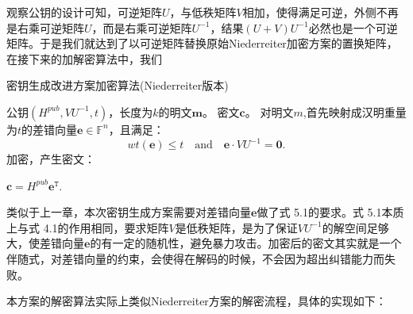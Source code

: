 观察公钥的设计可知，可逆矩阵$U$，与低秩矩阵$V$相加，使得满足可逆，外侧不再是右乘可逆矩阵$U$，而是右乘可逆矩阵$U^{-1}$，结果$(U + V)U^{-1}$必然也是一个可逆矩阵。于是我们就达到了以可逆矩阵替换原始Niederreiter加密方案的置换矩阵，在接下来的加解密算法中，我们

\begin{breakablealgorithm}
	\small
	\renewcommand{\algorithmicrequire}{\textbf{Input:}}
	\renewcommand{\algorithmicensure}{\textbf{Output:}}
	\caption{密钥生成改进方案加密算法(Niederreiter版本)}
	\label{alg:NeweEnN}
	\begin{algorithmic}[1]
		\Require
		公钥$(H^{pub},VU^{-1},t)$，长度为$k$的明文$\mathbf{m}$。
		\Ensure
		密文$\mathbf{c}$。
		\State
		对明文$m$,首先映射成汉明重量为$t$的差错向量$\mathbf{e} \in \mathbb{F}^n$，且满足：
		\begin{equation}
		wt(\mathbf{e})\leq t\quad \mbox{and}\quad \mathbf{e}\cdot VU^{-1} = \mathbf{0}.
		\end{equation}
		\State
		加密，产生密文：
		
		\centering $\mathbf{c} = H^{pub}\mathbf{e}^\mathtt{T}.$
	\end{algorithmic}
\end{breakablealgorithm}

类似于上一章，本次密钥生成方案需要对差错向量$\mathbf{e}$做了式 5.1的要求。式 5.1本质上与式 4.1的作用相同，要求矩阵$V$是低秩矩阵，是为了保证$VU^{-1}$的解空间足够大，使差错向量$\mathbf{e}$的有一定的随机性，避免暴力攻击。加密后的密文其实就是一个伴随式，对差错向量的约束，会使得在解码的时候，不会因为超出纠错能力而失败。

本方案的解密算法实际上类似Niederreiter方案的解密流程，具体的实现如下：

